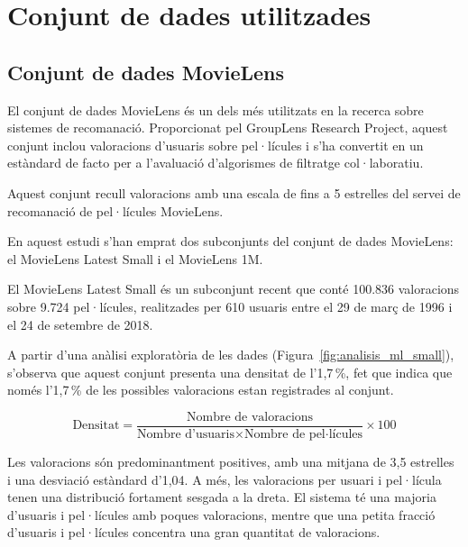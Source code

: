 \documentclass[a4paper,12pt]{report}
\begin{document}
\section{Conjunt de dades utilitzades}

\subsection{Conjunt de dades MovieLens} 

El conjunt de dades MovieLens \cite{harper2015movielens} és un dels més utilitzats en la recerca sobre sistemes de recomanació. Proporcionat pel GroupLens Research Project, aquest conjunt inclou valoracions d’usuaris sobre pel·lícules i s’ha convertit en un estàndard de facto per a l’avaluació d’algorismes de filtratge col·laboratiu.

Aquest conjunt recull valoracions amb una escala de fins a 5 estrelles del servei de recomanació de pel·lícules MovieLens.

En aquest estudi s’han emprat dos subconjunts del conjunt de dades MovieLens: el MovieLens Latest Small i el MovieLens 1M.

El MovieLens Latest Small és un subconjunt recent que conté 100.836 valoracions sobre 9.724 pel·lícules, realitzades per 610 usuaris entre el 29 de març de 1996 i el 24 de setembre de 2018.

A partir d’una anàlisi exploratòria de les dades (Figura~\ref{fig:analisis_ml_small}), s’observa que aquest conjunt presenta una densitat de l’1,7\,\%, fet que indica que només l’1,7\,\% de les possibles valoracions estan registrades al conjunt.

\[
\text{Densitat} = \frac{\text{Nombre de valoracions}}{\text{Nombre d’usuaris} \times \text{Nombre de pel·lícules}} \times 100
\]

Les valoracions són predominantment positives, amb una mitjana de 3,5 estrelles i una desviació estàndard d’1,04.
A més, les valoracions per usuari i pel·lícula tenen una distribució fortament sesgada a la dreta.
El sistema té una majoria d'usuaris i pel·lícules amb poques valoracions, mentre que una petita fracció d’usuaris i pel·lícules concentra una gran quantitat de valoracions.
\end{document}
